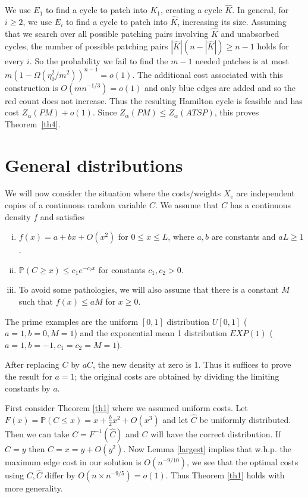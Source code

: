 \documentclass[12pt]{article}
\newcommand{\1}{\textbf{1}}
\newcommand{\wh}[1]{\widehat{#1}}
\def\Pr{\mathbb{P}}
\begin{document}
We use $E_1$ to find a cycle to patch into $K_1$, creating a cycle $\wh K$. In general, for $i\geq 2$, we use $E_i$ to find a cycle to patch into $\wh K$, increasing its size. Assuming that we search over all possible patching pairs involving $\wh K$ and unabsorbed cycles, the number of possible patching pairs $|\wh K|(n-|\wh K|)\geq n-1$ holds for every $i$. So the probability we fail to find the $m-1$ needed patches is at most $m(1-\Omega(\eta_0^2/m^2))^{n-1}=o(1)$. The additional cost associated with this construction is $O(mn^{-1/3})=o(1)$ and only blue edges are added and so the red count does not increase. Thus the resulting Hamilton cycle is feasible and has cost $Z_\alpha(PM)+o(1)$. Since $Z_\alpha(PM)\le Z_\alpha(ATSP)$, this proves Theorem~\ref{th4}.
\section{General distributions}\label{distributions}
We will now consider the situation where the costs/weights $X_e$ are independent copies of a continuous random variable $C$. We assume that $C$ has a continuous density $f$ and satisfies
\begin{enumerate}[(i)]
\item $f(x)=a+bx+O(x^2)$ for $0\leq x\leq L$, where $a,b$ are constants and $aL\geq 1$. 
\item $\Pr(C\geq x)\leq c_1e^{-c_2x}$ for constants $c_1,c_2>0$.
\item To avoid some pathologies, we will also assume that there is a constant $M$ such that $f(x)\leq aM$ for $x\geq 0$.
\end{enumerate}
The prime examples are the uniform $[0,1]$ distribution $U[0,1]$ ($a=1,b=0,M=1$) and the exponential mean 1 distribution $EXP(1)$ ($a=1,b=-1,c_1=c_2=M=1$). 

After replacing $C$ by $aC$, the new density at zero is 1. Thus it suffices to prove the
result for $a = 1$; the original costs are obtained by dividing the limiting constants by $a$.


First consider Theorem \ref{th1} where we assumed uniform costs. Let $F(x)=\Pr(C\leq x)=x+\frac b2x^2+O(x^3)$ and let $\wh C$ be uniformly distributed. Then we can take $C=F^{-1}(\wh C)$ and $C$ will have the correct distribution. If $\wh C=y$ then $C=x=y+O(y^2)$. Now Lemma \ref{largest} implies that w.h.p. the maximum edge cost in our solution is $O(n^{-9/10})$, we see that the optimal costs using $C,\wh C$ differ by $O(n\times n^{-9/5})=o(1)$. Thus Theorem \ref{th1} holds with more generality.
\end{document}
